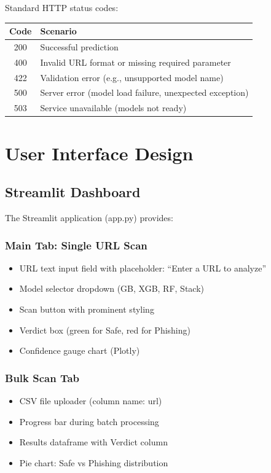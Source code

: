 \documentclass[12pt,a4paper]{report}
\begin{document}
Standard HTTP status codes:

\begin{longtable}{c l}
\toprule
\textbf{Code} & \textbf{Scenario} \\
\midrule
200 & Successful prediction \\
400 & Invalid URL format or missing required parameter \\
422 & Validation error (e.g., unsupported model name) \\
500 & Server error (model load failure, unexpected exception) \\
503 & Service unavailable (models not ready) \\
\bottomrule
\end{longtable}

\chapter{User Interface Design}

\section{Streamlit Dashboard}

The Streamlit application (app.py) provides:

\subsection{Main Tab: Single URL Scan}
\begin{itemize}[leftmargin=*]
    \item URL text input field with placeholder: ``Enter a URL to analyze''
    \item Model selector dropdown (GB, XGB, RF, Stack)
    \item Scan button with prominent styling
    \item Verdict box (green for Safe, red for Phishing)
    \item Confidence gauge chart (Plotly)
\end{itemize}

\subsection{Bulk Scan Tab}
\begin{itemize}[leftmargin=*]
    \item CSV file uploader (column name: url)
    \item Progress bar during batch processing
    \item Results dataframe with Verdict column
    \item Pie chart: Safe vs Phishing distribution
\end{itemize}
\end{document}
